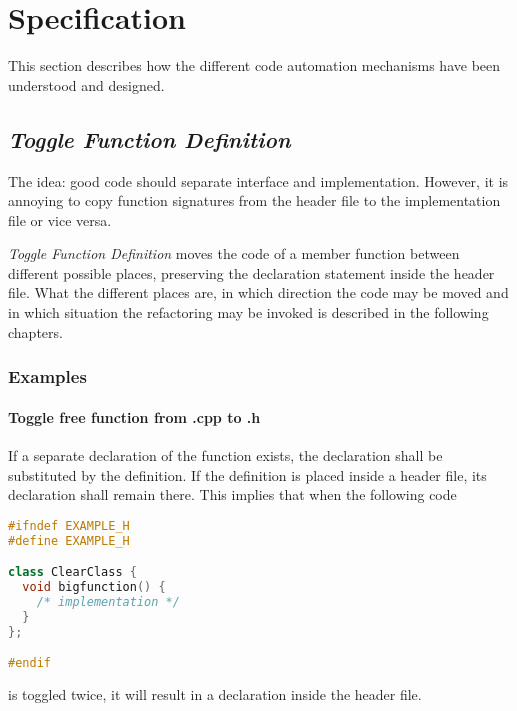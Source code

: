 \chapter{Specification}
\thispagestyle{fancy}

This section describes how the different code automation mechanisms have been
understood and designed.

\section{\textit{Toggle Function Definition}}

The idea: good code should separate interface and implementation. However, it is 
annoying to copy function signatures from the header file to the implementation 
file or vice versa. 

\textit{Toggle Function Definition} moves the code of a member function between 
different possible places, preserving the declaration statement inside the 
header file. What the different places are, in which direction the code may be 
moved and in which situation the refactoring may be invoked is described in the 
following chapters. 

\subsection{Examples}

\subsubsection{Toggle free function from .cpp to .h}
If  a separate declaration of the function exists,
the declaration shall be substituted by the definition. If the definition is 
placed inside a header file, its declaration shall remain there. This implies 
that when the following code 

\begin{lstlisting}[caption={A.h},label={01freefuncPre},language=C++]
#ifndef EXAMPLE_H
#define EXAMPLE_H

class ClearClass {
  void bigfunction() {
    /* implementation */
  }
};

#endif
\end{lstlisting}

is toggled twice, it will result in a declaration inside the header file.

